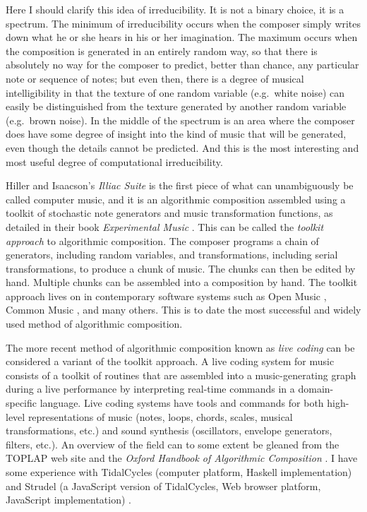 \documentclass[11pt]{scrartcl}
\begin{document}
Here I should clarify this idea of irreducibility. It is not a binary choice, it is a spectrum. The minimum of irreducibility occurs when the composer simply writes down what he or she hears in his or her imagination. The maximum occurs when the composition is generated in an entirely random way, so that there is absolutely no way for the composer to predict, better than chance, any particular note or sequence of notes; but even then, there is a degree of musical intelligibility in that the texture of one random variable (e.g.\ white noise) can easily be distinguished from the texture generated by another random variable (e.g.\ brown noise). In the middle of the spectrum is an area where the composer does have some degree of insight into the kind of music that will be generated, even though the details cannot be predicted. And this is the most interesting and most useful degree of computational irreducibility.

Hiller and Isaacson's \emph{Illiac Suite} \parencite{illiacsuite} is the first piece of what can unambiguously be called computer music, and it is an algorithmic composition assembled using a toolkit of stochastic note generators and music transformation functions, as detailed in their book \emph{Experimental Music} \parencite{hiller}. This can be called the \emph{toolkit approach} to algorithmic composition. The composer programs a chain of generators, including random variables, and transformations, including serial transformations, to produce a chunk of music. The chunks can then be edited by hand. Multiple chunks can be assembled into a composition by hand. The toolkit approach lives on in contemporary software systems such as Open Music \parencite{OpenMusic}, Common Music \parencite{CommonMusic, musx}, and many others. This is to date the most successful and widely used method of algorithmic composition.

The more recent method of algorithmic composition known as \emph{live coding} can be considered a variant of the toolkit approach. A live coding system for music consists of a toolkit of routines that are assembled into a music-generating graph during a live performance by interpreting real-time commands in a domain-specific language. Live coding systems have tools and commands for both high-level representations of music (notes, loops, chords, scales, musical transformations, etc.) and sound synthesis (oscillators, envelope generators, filters, etc.). An overview of the field can to some extent be gleaned from the TOPLAP web site \parencite{toplap} and the \emph{Oxford Handbook of Algorithmic Composition} \parencite{mclean2018oxford}. I have some experience with TidalCycles (computer platform, Haskell implementation) \parencite{tidalcycles} and Strudel (a JavaScript version of TidalCycles, Web browser platform, JavaScript implementation) \parencite{strudel}.
\end{document}
